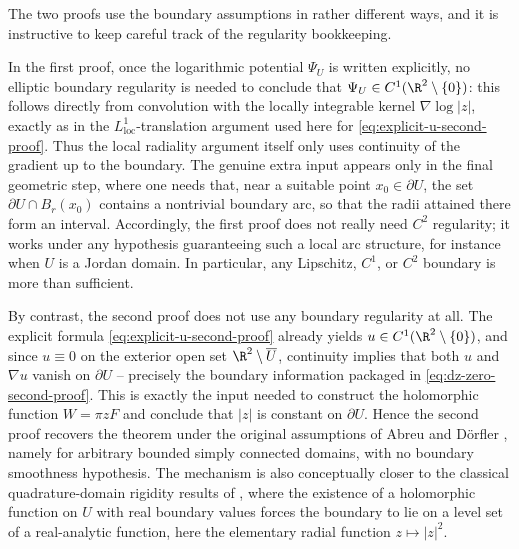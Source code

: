\begin{remark}
The two proofs use the boundary assumptions in rather different ways, and it is instructive to
keep careful track of the regularity bookkeeping.

In the first proof, once the logarithmic potential \(\Psi_U\) is written explicitly, no elliptic
boundary regularity is needed to conclude that \(\Psi_U\in C^1(\R^2\setminus\{0\})\): this follows
directly from convolution with the locally integrable kernel \(\nabla\log|z|\), exactly as in the
\(L^1_{\mathrm{loc}}\)-translation argument used here for \eqref{eq:explicit-u-second-proof}. Thus
the local radiality argument itself only uses continuity of the gradient up to the boundary. The
genuine extra input appears only in the final geometric step, where one needs that, near a suitable
point \(x_0\in \partial U\), the set \(\partial U\cap B_r(x_0)\) contains a nontrivial boundary
arc, so that the radii attained there form an interval. Accordingly, the first proof does not
really need \(C^2\) regularity; it works under any hypothesis guaranteeing such a local arc
structure, for instance when \(U\) is a Jordan domain. In particular, any Lipschitz, \(C^1\), or
\(C^2\) boundary is more than sufficient.

By contrast, the second proof does not use any boundary regularity at all. The explicit formula
\eqref{eq:explicit-u-second-proof} already yields \(u\in C^1(\R^2\setminus\{0\})\), and since
\(u\equiv 0\) on the exterior open set \(\R^2\setminus \overline U\), continuity implies that both
\(u\) and \(\nabla u\) vanish on \(\partial U\) -- precisely the boundary information packaged in
\eqref{eq:dz-zero-second-proof}. This is exactly the input needed to construct the holomorphic
function \(W=\pi z F\) and conclude that \(|z|\) is constant on \(\partial U\). Hence the second
proof recovers the theorem under the original assumptions of Abreu and D\"orfler
\cite{Abreu-Doerfler}, namely for arbitrary bounded simply connected domains, with no boundary
smoothness hypothesis. The mechanism is also conceptually closer to the classical
quadrature-domain rigidity results of \cite{Aharonov-Schiffer-Zalcman,Gustafsson,Karp}, where the
existence of a holomorphic function on \(U\) with real boundary values forces the boundary to lie
on a level set of a real-analytic function, here the elementary radial function
\(z\mapsto |z|^2\).
\end{remark}
